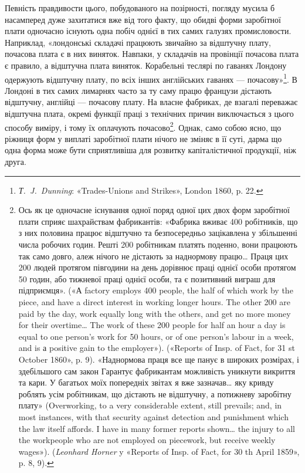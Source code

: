 Певність правдивости цього, побудованого на позірності, погляду
мусила б насамперед дуже захитатися вже від того факту,
що обидві форми заробітної плати одночасно існують одна побіч
однієї в тих самих галузях промисловости. Наприклад, «лондонські
складачі працюють звичайно за відштучну плату, почасова
плата є в них виняток. Навпаки, у складачів на провінції
почасова плата є правило, а відштучна плата виняток. Корабельні
теслярі по гаванях Лондону одержують відштучну плату, по
всіх інших англійських гаванях — почасову»\footnote{
\emph{Т.~J.~Dunning}: «Trades-Unions and Strikes», London 1860,
p. 22.
}. В Лондоні в
тих самих лимарнях часто за ту саму працю французи дістають
відштучну, англійці — почасову плату. На власне фабриках,
де взагалі переважає відштучна плата, окремі функції праці з
технічних причин виключається з цього способу виміру, і тому
їх оплачують почасово\footnote{
Ось як це одночасне існування одної поряд одної цих двох форм
заробітної плати сприяє шахрайствам фабрикантів: «Фабрика вживає
400 робітників, що з них половина працює відштучно та безпосередньо
зацікавлена у збільшенні числа робочих годин. Решті 200 робітникам
платять поденно, вони працюють так само довго, алеж нічого не дістають
за наднормову працю\dots{} Праця цих 200 людей протягом півгодини
на день дорівнює праці однієї особи протягом 50 годин, або  тижневої
праці однієї особи, та є позитивний виграш для підприємця». («А factory
employs 400 people, the half of which work by the piece, and have a direct
interest in working longer hours. The other 200 are paid by the day,
work equally long with the others, and get no more money for their overtime\dots{}
The work of these 200 people for half an hour a day is equal to one
person’s work for 50 hours, or  of one person’s labour in a week, and is
а positive gain to the employer»). («Reports of Insp. of Fact, for 31 st
October 1860», p. 9). «Наднормова праця все ще панує в широких розмірах,
і здебільшого сам закон Гарантує фабрикантам можливість уникнути
викриття та кари. У багатьох моїх попередніх звітах я вже зазначав\dots{}
яку кривду роблять усім робітникам, що дістають не відштучну, а потижневу
заробітну плату» (Overworking, to a very considerable extent,
still prevails; and, in most instances, with that security against detection
and punishment which the law itself affords. I have in many former reports
shown\dots{} the injury to all the workpeople who are not employed on piecework,
but receive weekly wages»). (\emph{Leonhard Horner} y «Reports of Insp.
of Fact, for 30 th April 1859», p. 8, 9).
}. Однак, само собою ясно, що ріжниця
форм у виплаті заробітної плати нічого не зміняє в її суті, дарма
що одна форма може бути сприятливіша для розвитку капіталістичної
продукції, ніж друга.

